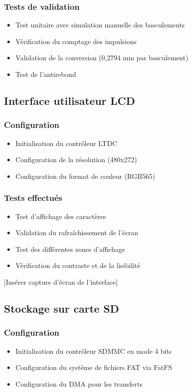 \documentclass[12pt]{article}
\begin{document}
\subsubsection{Tests de validation}
\begin{itemize}
    \item Test unitaire avec simulation manuelle des basculements
    \item Vérification du comptage des impulsions
    \item Validation de la conversion (0,2794 mm par basculement)
    \item Test de l'antirebond
\end{itemize}

\subsection{Interface utilisateur LCD}
\subsubsection{Configuration}
\begin{itemize}
    \item Initialisation du contrôleur LTDC
    \item Configuration de la résolution (480x272)
    \item Configuration du format de couleur (RGB565)
\end{itemize}

\subsubsection{Tests effectués}
\begin{itemize}
    \item Test d'affichage des caractères
    \item Validation du rafraîchissement de l'écran
    \item Test des différentes zones d'affichage
    \item Vérification du contraste et de la lisibilité
\end{itemize}

[Insérer capture d'écran de l'interface]

\subsection{Stockage sur carte SD}
\subsubsection{Configuration}
\begin{itemize}
    \item Initialisation du contrôleur SDMMC en mode 4 bits
    \item Configuration du système de fichiers FAT via FatFS
    \item Configuration du DMA pour les transferts
\end{itemize}
\end{document}
